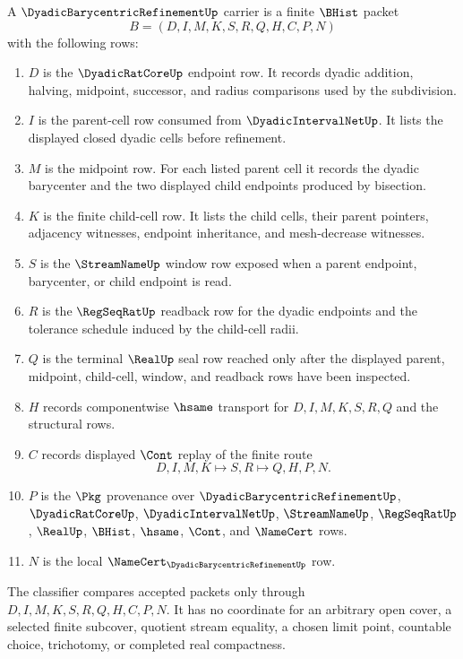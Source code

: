 \begin{definition}\label{def:dyadic-barycentric-refinement-carrier}
A $\DyadicBarycentricRefinementUp$ carrier is a finite $\BHist$ packet
$$
B=(D,I,M,K,S,R,Q,H,C,P,N)
$$
with the following rows:
\begin{enumerate}
\item $D$ is the $\DyadicRatCoreUp$ endpoint row. It records dyadic addition, halving, midpoint, successor, and radius comparisons used by the subdivision.
\item $I$ is the parent-cell row consumed from $\DyadicIntervalNetUp$. It lists the displayed closed dyadic cells before refinement.
\item $M$ is the midpoint row. For each listed parent cell it records the dyadic barycenter and the two displayed child endpoints produced by bisection.
\item $K$ is the finite child-cell row. It lists the child cells, their parent pointers, adjacency witnesses, endpoint inheritance, and mesh-decrease witnesses.
\item $S$ is the $\StreamNameUp$ window row exposed when a parent endpoint, barycenter, or child endpoint is read.
\item $R$ is the $\RegSeqRatUp$ readback row for the dyadic endpoints and the tolerance schedule induced by the child-cell radii.
\item $Q$ is the terminal $\RealUp$ seal row reached only after the displayed parent, midpoint, child-cell, window, and readback rows have been inspected.
\item $H$ records componentwise $\hsame$ transport for $D,I,M,K,S,R,Q$ and the structural rows.
\item $C$ records displayed $\Cont$ replay of the finite route
$$
D,I,M,K \longmapsto S,R \longmapsto Q,H,P,N .
$$
\item $P$ is the $\Pkg$ provenance over $\DyadicBarycentricRefinementUp$, $\DyadicRatCoreUp$, $\DyadicIntervalNetUp$, $\StreamNameUp$, $\RegSeqRatUp$, $\RealUp$, $\BHist$, $\hsame$, $\Cont$, and $\NameCert$ rows.
\item $N$ is the local $\NameCert_{\DyadicBarycentricRefinementUp}$ row.
\end{enumerate}
The classifier compares accepted packets only through $D,I,M,K,S,R,Q,H,C,P,N$. It has no coordinate for an arbitrary open cover, a selected finite subcover, quotient stream equality, a chosen limit point, countable choice, trichotomy, or completed real compactness.
\end{definition}

